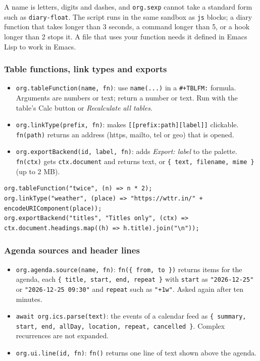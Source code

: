 \documentclass[11pt]{article}
\begin{document}
A name is letters, digits and dashes, and \texttt{org.sexp} cannot take a standard form such as \texttt{diary-float}. The script runs in the same sandbox as \texttt{js} blocks; a diary function that takes longer than 3 seconds, a command longer than 5, or a hook longer than 2 stops it. A file that uses your function needs it defined in Emacs Lisp to work in Emacs.

\subsubsection{Table functions, link types and exports}
\label{sec:orga889155}
\begin{itemize}
\item \texttt{org.tableFunction(name, fn)}: use \texttt{name(...)} in a \texttt{\#+TBLFM:} formula. Arguments are numbers or text; return a number or text. Run with the table's Calc button or \emph{Recalculate all tables}.
\item \texttt{org.linkType(prefix, fn)}: makes \texttt{[[prefix:path][label]]} clickable. \texttt{fn(path)} returns an address (https, mailto, tel or geo) that is opened.
\item \texttt{org.exportBackend(id, label, fn)}: adds \emph{Export: label} to the palette. \texttt{fn(ctx)} gets \texttt{ctx.document} and returns text, or \texttt{\{ text, filename, mime \}} (up to 2 MB).
\end{itemize}

\begin{verbatim}
org.tableFunction("twice", (n) => n * 2);
org.linkType("weather", (place) => "https://wttr.in/" + encodeURIComponent(place));
org.exportBackend("titles", "Titles only", (ctx) => ctx.document.headings.map((h) => h.title).join("\n"));
\end{verbatim}

\subsubsection{Agenda sources and header lines}
\label{sec:org2126b33}
\begin{itemize}
\item \texttt{org.agenda.source(name, fn)}: \texttt{fn(\{ from, to \})} returns items for the agenda, each \texttt{\{ title, start, end, repeat \}} with \texttt{start} as \texttt{"2026-12-25"} or \texttt{"2026-12-25 09:30"} and \texttt{repeat} such as \texttt{"+1w"}. Asked again after ten minutes.
\item \texttt{await org.ics.parse(text)}: the events of a calendar feed as \texttt{\{ summary, start, end, allDay, location, repeat, cancelled \}}. Complex recurrences are not expanded.
\item \texttt{org.ui.line(id, fn)}: \texttt{fn()} returns one line of text shown above the agenda.
\end{itemize}
\end{document}
